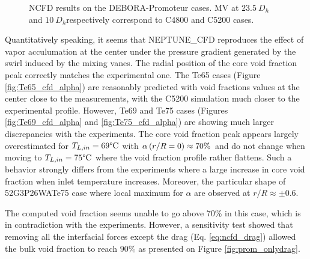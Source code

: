 \begin{figure}[!htb]
{\label{fig:Te69_cfd_Uvap}
}
\caption{NCFD results on the DEBORA-Promoteur cases. MV at $23.5\ D_{h}$ and $10\ D_{h}$respectively correspond to C4800 and C5200 cases.}
\label{fig:debprom_ncfd}
\end{figure}
%



\clearpage



Quantitatively speaking, it seems that NEPTUNE\_CFD reproduces the effect of vapor acculumation at the center under the pressure gradient generated by the swirl induced by the mixing vanes. The radial position of the core void fraction peak correctly matches the experimental one. The Te65 cases (Figure \ref{fig:Te65_cfd_alpha}) are reasonably predicted with void fractions values at the center close to the measurements, with the C5200 simulation much closer to the experimental profile. However, Te69 and Te75 cases (Figures \ref{fig:Te69_cfd_alpha} and \ref{fig:Te75_cfd_alpha}) are showing much larger discrepancies with the experiments. The core void fraction peak appears largely overestimated for $T_{L,in}=69\degree\mathrm{C}$ with $\alpha\left( r/R= 0 \right) \approx 70\%$ and do not change when moving to $T_{L,in}=75\degree\mathrm{C}$ where the void fraction profile rather flattens. Such a behavior strongly differs from the experiments where a large increase in core void fraction when inlet temperature increases. Moreover, the particular shape of 52G3P26WATe75 case where local maximum for $\alpha$ are observed at $r/R \approx \pm 0.6$.

\begin{remark*}{}
The computed void fraction seems unable to go above 70\% in this case, which is in contradiction with the experiments. However, a sensitivity test showed that removing all the interfacial forces except the drag (Eq. \ref{eq:ncfd_drag}) allowed the bulk void fraction to reach $90\%$ as presented on Figure \ref{fig:prom_onlydrag}.

\end{remark*}

